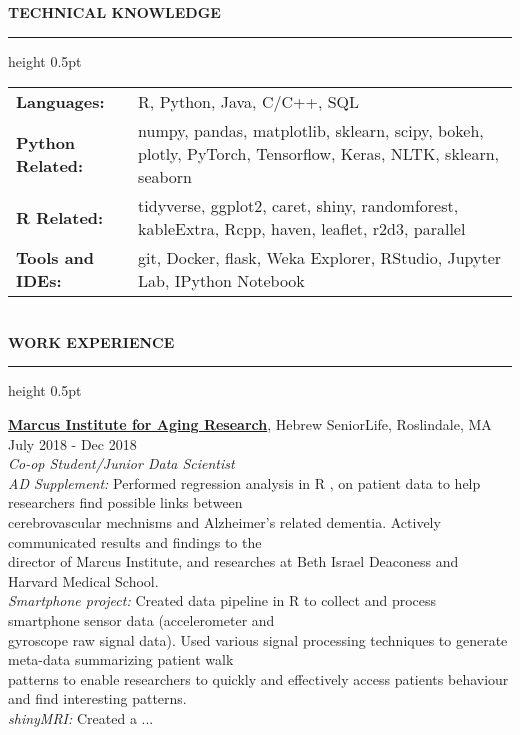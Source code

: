 \documentclass[a4paper]{article}
\newcommand{\myline}{\par
  \kern2pt %
  \hrule height 0.5pt
  \kern2pt %
}
\newcommand{\mybullet}{
	\indent \textbullet \hspace*{2mm}
}
\begin{document}
	\noindent
	{\large \textbf{TECHNICAL KNOWLEDGE}}
	\myline 
	
	\noindent
	\begin{tabular}{ m{3cm} l }
		\textbf{Languages: } & R, Python, Java, C/C++, SQL \\ 
    \textbf{Python Related: } & numpy, pandas, matplotlib, sklearn, scipy, bokeh, plotly, PyTorch, 
    Tensorflow, Keras, NLTK, sklearn, seaborn \\ 
    \textbf{R Related: } & tidyverse, ggplot2, caret, shiny, randomforest, kableExtra, Rcpp, 
    haven, leaflet, r2d3, parallel \\
		\textbf{Tools and IDEs: } & git, Docker, flask, Weka Explorer, RStudio, 
                Jupyter Lab, IPython Notebook\\
	\end{tabular} \\

	\smallskip
	\smallskip
	\noindent
	{\large \textbf{WORK EXPERIENCE}}
	\myline 
	\smallskip
	
  \noindent
  \textbf{\href{https://www.marcusinstituteforaging.org/}{Marcus Institute for Aging Research}}, 
  Hebrew SeniorLife, Roslindale, MA 
  \hfill July 2018 - Dec 2018\\
        \textit{Co-op Student/Junior Data Scientist} \\
        \mybullet \textit{AD Supplement:} Performed regression analysis in R , on patient data to 
        help researchers find possible links between \\ \hspace*{9mm} cerebrovascular mechnisms 
        and Alzheimer's related dementia. Actively communicated results and findings to the  \\ 
        \hspace*{9mm} director of Marcus Institute, and researches at Beth Israel Deaconess and 
        Harvard Medical School. \\
				\mybullet \textit{Smartphone project:} Created data pipeline in R to collect and process 
        smartphone sensor data (accelerometer and \\ \hspace*{9mm} gyroscope raw signal data). 
        Used various signal processing techniques to generate meta-data summarizing patient walk 
        \\ \hspace*{9mm} patterns to enable researchers to quickly and effectively access 
        patients behaviour and find interesting patterns. \\
        \mybullet \textit{shinyMRI: } Created a ...
        
\end{document}

